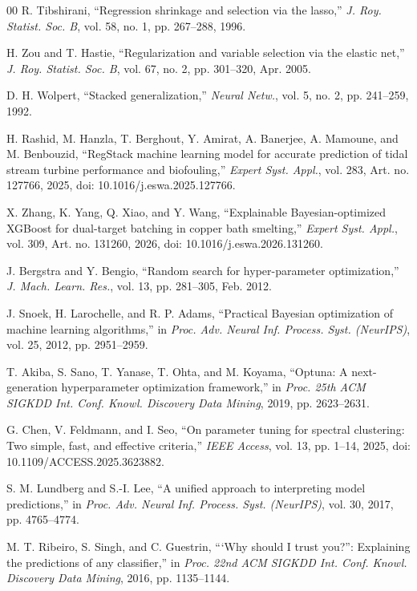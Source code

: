 \documentclass{ieeeaccess}
\begin{document}
\begin{thebibliography}{00}
 R. Tibshirani, ``Regression shrinkage and selection via the lasso,'' \emph{J. Roy. Statist. Soc. B}, vol. 58, no. 1, pp. 267--288, 1996.

 H. Zou and T. Hastie, ``Regularization and variable selection via the elastic net,'' \emph{J. Roy. Statist. Soc. B}, vol. 67, no. 2, pp. 301--320, Apr. 2005.

 D. H. Wolpert, ``Stacked generalization,'' \emph{Neural Netw.}, vol. 5, no. 2, pp. 241--259, 1992.

 H. Rashid, M. Hanzla, T. Berghout, Y. Amirat, A. Banerjee, A. Mamoune, and M. Benbouzid, ``RegStack machine learning model for accurate prediction of tidal stream turbine performance and biofouling,'' \emph{Expert Syst. Appl.}, vol. 283, Art. no. 127766, 2025, doi: 10.1016/j.eswa.2025.127766.

 X. Zhang, K. Yang, Q. Xiao, and Y. Wang, ``Explainable Bayesian-optimized XGBoost for dual-target batching in copper bath smelting,'' \emph{Expert Syst. Appl.}, vol. 309, Art. no. 131260, 2026, doi: 10.1016/j.eswa.2026.131260.

 J. Bergstra and Y. Bengio, ``Random search for hyper-parameter optimization,'' \emph{J. Mach. Learn. Res.}, vol. 13, pp. 281--305, Feb. 2012.

 J. Snoek, H. Larochelle, and R. P. Adams, ``Practical Bayesian optimization of machine learning algorithms,'' in \emph{Proc. Adv. Neural Inf. Process. Syst. (NeurIPS)}, vol. 25, 2012, pp. 2951--2959.

 T. Akiba, S. Sano, T. Yanase, T. Ohta, and M. Koyama, ``Optuna: A next-generation hyperparameter optimization framework,'' in \emph{Proc. 25th ACM SIGKDD Int. Conf. Knowl. Discovery Data Mining}, 2019, pp. 2623--2631.

 G. Chen, V. Feldmann, and I. Seo, ``On parameter tuning for spectral clustering: Two simple, fast, and effective criteria,'' \emph{IEEE Access}, vol. 13, pp. 1--14, 2025, doi: 10.1109/ACCESS.2025.3623882.

 S. M. Lundberg and S.-I. Lee, ``A unified approach to interpreting model predictions,'' in \emph{Proc. Adv. Neural Inf. Process. Syst. (NeurIPS)}, vol. 30, 2017, pp. 4765--4774.

 M. T. Ribeiro, S. Singh, and C. Guestrin, ``{`}Why should I trust you?'': Explaining the predictions of any classifier,'' in \emph{Proc. 22nd ACM SIGKDD Int. Conf. Knowl. Discovery Data Mining}, 2016, pp. 1135--1144.


\end{thebibliography}
\end{document}
